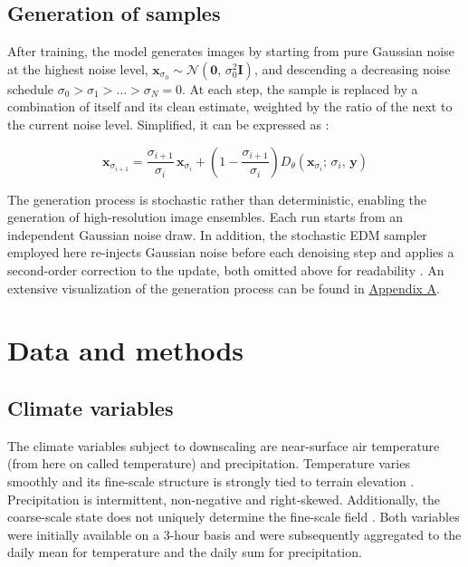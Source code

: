 \documentclass[
]{krantz}
\begin{document}
\subsection{Generation of samples}\label{generation-of-samples}

After training, the model generates images by starting from pure Gaussian noise at the highest noise level, \(\boldsymbol{x}_{\sigma_0} \sim \mathcal{N}(\boldsymbol{0},\, \sigma_0^2\mathbf{I})\),
and descending a decreasing noise schedule \(\sigma_0 > \sigma_1 > \dots > \sigma_N = 0\). At each step, the sample is replaced by a combination of itself and its clean estimate,
weighted by the ratio of the next to the current noise level. Simplified, it can be expressed as \citep{karras2022}:

\[
\boldsymbol{x}_{\sigma_{i+1}} = \frac{\sigma_{i+1}}{\sigma_i}\, \boldsymbol{x}_{\sigma_i} + \left(1 - \frac{\sigma_{i+1}}{\sigma_i}\right) D_\theta\left(\boldsymbol{x}_{\sigma_i};\, \sigma_i,\, \boldsymbol{y}\right)
\]

The generation process is stochastic rather than deterministic, enabling the generation of high-resolution image ensembles. Each run starts from an independent Gaussian noise draw. In addition, the stochastic EDM sampler employed here re-injects Gaussian noise before each denoising step
and applies a second-order correction to the update, both omitted above for readability \citep{karras2022}.
An extensive visualization of the generation process can be found in \hyperref[ddm-appendix-a]{Appendix A}.

\section{Data and methods}\label{data-and-methods}

\subsection{Climate variables}\label{climate-variables}

The climate variables subject to downscaling are near-surface air temperature (from here on called temperature) and precipitation.
Temperature varies smoothly and its fine-scale structure is strongly tied to terrain elevation \citep{tomasi2025}. Precipitation is intermittent, non-negative and right-skewed.
Additionally, the coarse-scale state does not uniquely determine the fine-scale field \citep{addison2026}.
Both variables were initially available on a 3-hour basis and were subsequently aggregated to the daily mean for temperature and the daily sum for precipitation.
\end{document}
